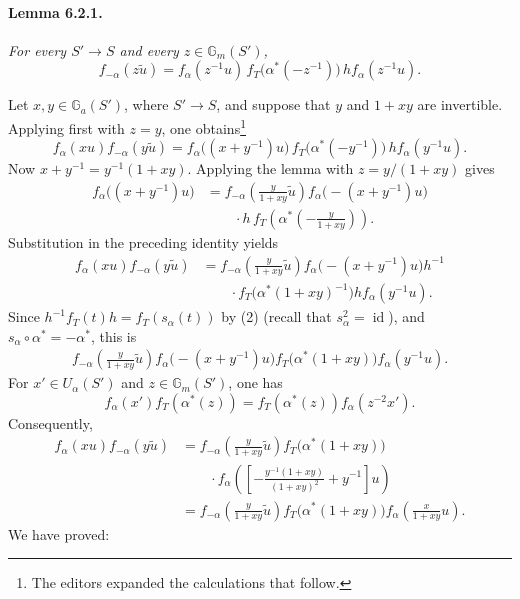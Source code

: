 \paragraph{\textbf{Lemma 6.2.1.}}
\emph{For every \(S'\to S\) and every
\(z\in\mathbb G_m(S')\),}
\[
 f_{-\alpha}(z\widetilde u)
 =
 f_\alpha(z^{-1}u)\,
 f_T\bigl(\alpha^\ast(-z^{-1})\bigr)\,
 h f_\alpha(z^{-1}u).
\]



Let \(x,y\in\mathbb G_a(S')\), where \(S'\to S\), and suppose that
\(y\) and \(1+xy\) are invertible.  Applying  first with
\(z=y\), one obtains\footnote{The editors expanded the calculations
that follow.}
\[
 f_\alpha(xu)f_{-\alpha}(y\widetilde u)
 =
 f_\alpha\bigl((x+y^{-1})u\bigr)\,
 f_T\bigl(\alpha^\ast(-y^{-1})\bigr)\,
 h f_\alpha(y^{-1}u).
\]
Now \(x+y^{-1}=y^{-1}(1+xy)\).  Applying the lemma with
\(z=y/(1+xy)\) gives
\[
\begin{aligned}
 f_\alpha\bigl((x+y^{-1})u\bigr)
 &=
 f_{-\alpha}\!\left(\frac{y}{1+xy}\widetilde u\right)
 f_\alpha\bigl(-(x+y^{-1})u\bigr)\\
 &\qquad{}\cdot h\,
 f_T\!\left(\alpha^\ast\!\left(-\frac{y}{1+xy}\right)\right).
\end{aligned}
\]
Substitution in the preceding identity yields
\[
\begin{aligned}
 f_\alpha(xu)f_{-\alpha}(y\widetilde u)
 &=
 f_{-\alpha}\!\left(\frac{y}{1+xy}\widetilde u\right)
 f_\alpha\bigl(-(x+y^{-1})u\bigr)h^{-1}\\
 &\qquad{}\cdot
 f_T\bigl(\alpha^\ast(1+xy)^{-1}\bigr)
 h f_\alpha(y^{-1}u).
\end{aligned}
\]
Since \(h^{-1}f_T(t)h=f_T(s_\alpha(t))\) by \textup{(2)}
\textup{(recall that \(s_\alpha^2=\operatorname{id}\))}, and
\(s_\alpha\circ\alpha^\ast=-\alpha^\ast\), this is
\[
\begin{aligned}
 f_{-\alpha}\!\left(\frac{y}{1+xy}\widetilde u\right)
 f_\alpha\bigl(-(x+y^{-1})u\bigr)
 f_T\bigl(\alpha^\ast(1+xy)\bigr)
 f_\alpha(y^{-1}u).
\end{aligned}
\]
For \(x'\in U_\alpha(S')\) and
\(z\in\mathbb G_m(S')\), one has
\[
 f_\alpha(x')f_T(\alpha^\ast(z))
 =
 f_T(\alpha^\ast(z))f_\alpha(z^{-2}x').
\]
Consequently,
\[
\begin{aligned}
 f_\alpha(xu)f_{-\alpha}(y\widetilde u)
 &=
 f_{-\alpha}\!\left(\frac{y}{1+xy}\widetilde u\right)
 f_T\bigl(\alpha^\ast(1+xy)\bigr)\\
 &\qquad{}\cdot
 f_\alpha\!\left(
 \left[
 -\frac{y^{-1}(1+xy)}{(1+xy)^2}+y^{-1}
 \right]u
 \right)\\
 &=
 f_{-\alpha}\!\left(\frac{y}{1+xy}\widetilde u\right)
 f_T\bigl(\alpha^\ast(1+xy)\bigr)
 f_\alpha\!\left(\frac{x}{1+xy}u\right).
\end{aligned}
\]
We have proved:

